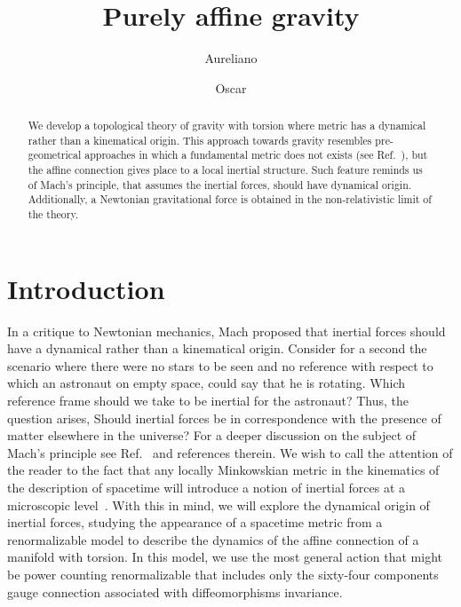 \documentclass[twocolumn,aps,
  showpacs,showkeys,prd,superscriptaddress]{revtex4-1}
\begin{document}
\title{Purely affine gravity}


\author{Aureliano }

\author{Oscar }

\begin{abstract}
  We develop a topological theory of gravity with torsion where metric has a dynamical rather than a kinematical origin. This approach towards gravity resembles pre-geometrical approaches in which a fundamental metric does not exists (see Ref.~\cite{WheelerPre}), but the  affine connection gives place to a local inertial structure. Such feature reminds us of Mach's principle, that assumes the inertial forces, should have dynamical origin. Additionally, a Newtonian gravitational force is obtained in the non-relativistic limit of the theory.
\end{abstract}



\maketitle


\section{Introduction}

In a critique to Newtonian mechanics, Mach proposed that inertial forces should have a dynamical rather than a kinematical origin. Consider for a second the scenario where there were no stars to be seen and no reference with respect to which an astronaut on empty space, could say that he is rotating. Which reference frame should we take to be inertial for the astronaut?  Thus, the question arises, Should inertial forces  be in correspondence with the presence of matter elsewhere in the universe? For a deeper discussion on the subject of Mach's principle see Ref.~\cite{Lichtenegger:2004re} and references therein.  We wish to call the attention of the reader to the fact that any locally Minkowskian metric in the kinematics of the description of spacetime will introduce a notion of inertial forces at a microscopic level~\cite{Sciama:1964wt}. With this in mind, we will explore the dynamical origin of inertial forces, studying the appearance of a spacetime metric from a renormalizable model to describe the dynamics of the affine connection of a manifold with torsion. In this model, we use the most general action that might be power counting renormalizable that includes only the sixty-four components gauge connection associated with diffeomorphisms invariance.
\end{document}
